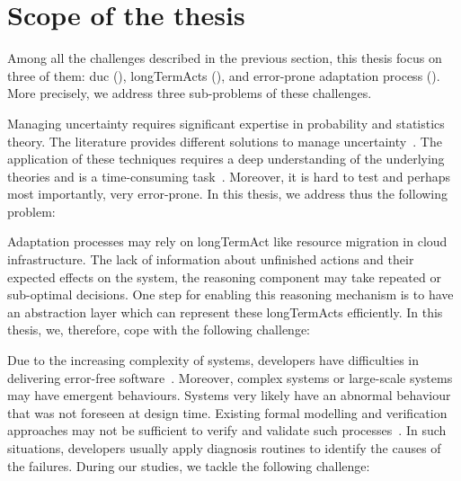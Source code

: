 \section{Scope of the thesis}
\label{sec:intro:scope}

Among all the challenges described in the previous section, this thesis focus on three of them: \gls{duc} (), \glspl{longTermAct} (), and error-prone adaptation process ().
More precisely, we address three sub-problems of these challenges.

Managing uncertainty requires significant expertise in probability and statistics theory.
The literature provides different solutions to manage uncertainty~\cite{zadeh1996fuzzy,metrology2008evaluation,shafer1992dempster}.
The application of these techniques requires a deep understanding of the underlying theories and is a time-consuming task~\cite{DBLP:conf/quatic/VallecilloMO16}.
Moreover, it is hard to test and perhaps most importantly, very error-prone.
In this thesis, we address thus the following problem:
\vspace{-2em}

Adaptation processes may rely on \gls{longTermAct} like resource migration in cloud infrastructure.
The lack of information about unfinished actions and their expected effects on the system, the reasoning component may take repeated or sub-optimal decisions.
One step for enabling this reasoning mechanism is to have an abstraction layer which can represent these \glspl{longTermAct} efficiently.
In this thesis, we, therefore, cope with the following challenge:
\vspace{-2em}

Due to the increasing complexity of systems, developers have difficulties in delivering error-free software~\cite{DBLP:conf/icse/BarbosaLMJ17, DBLP:conf/icse/MongielloPS15, DBLP:conf/icse/HassanBB15}.
Moreover, complex systems or large-scale systems may have emergent behaviours.
Systems very likely have an abnormal behaviour that was not foreseen at design time.
Existing formal modelling and verification approaches may not be sufficient to verify and validate such processes~\cite{DBLP:conf/icse/TaharaOH17}.
In such situations, developers usually apply diagnosis routines to identify the causes of the failures.
During our studies, we tackle the following challenge:
\vspace{-2em}

